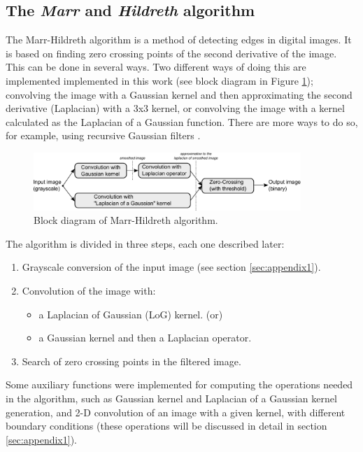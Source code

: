 \documentclass{ipol}
\numberwithin{equation}{section}
\numberwithin{table}{section}
\numberwithin{figure}{section}
\begin{document}

\subsection{The \textit{Marr} and \textit{Hildreth} algorithm}

The Marr-Hildreth algorithm is a method of detecting edges in digital 
images. It is based on finding zero crossing points of the second derivative
of the image. This can be done in several ways. Two different ways of doing 
this are implemented implemented in this work (see block diagram in Figure 
\ref{fig:blockdiagram2}); convolving the image with a Gaussian kernel and then 
approximating the second derivative (Laplacian) with a 3x3 kernel, or 
convolving the image with a kernel calculated as the Laplacian of a 
Gaussian function. There are more ways to do so, for example, using 
recursive Gaussian filters \cite{Deriche1993Recursively}. \\
\clearpage

\begin{figure}[!t]
	\centering
	\includegraphics[width=0.9\textwidth]{blockdiagram2.pdf}
	\caption{Block diagram of Marr-Hildreth algorithm.}
	\label{fig:blockdiagram2}
\end{figure}

The algorithm is divided in three steps, each one described later:
\begin{enumerate}
	\item Grayscale conversion of the input image (see section \ref{sec:appendix1}).
	\item Convolution of the image with:
	\begin{itemize}
		\item a Laplacian of Gaussian (LoG) kernel. (or)
		\item a Gaussian kernel and then a Laplacian operator.
	\end{itemize}
	\item Search of zero crossing points in the filtered image.
\end{enumerate}

Some auxiliary functions were implemented for computing the operations
needed in the algorithm, such as Gaussian kernel and Laplacian of a Gaussian 
kernel generation, and 2-D convolution of an image with a given kernel, 
with different boundary conditions (these operations will be discussed 
in detail in section \ref{sec:appendix1}).
\end{document}
